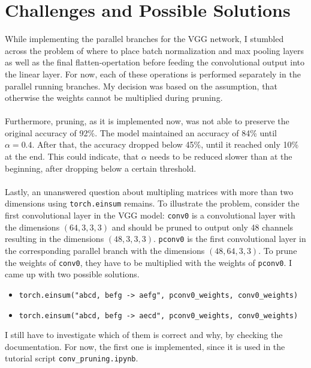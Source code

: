 \documentclass[10pt,twocolumn,letterpaper]{article}
\begin{document}
\section{Challenges and Possible Solutions}
While implementing the parallel branches for the VGG network, I stumbled across the problem of where to place batch normalization and max pooling layers as well as the final flatten-opertation before feeding the convolutional output into the linear layer.
For now, each of these operations is performed separately in the parallel running branches.
My decision was based on the assumption, that otherwise the weights cannot be multiplied during pruning.\\\\
Furthermore, pruning, as it is implemented now, was not able to preserve the original accuracy of 92\%.
The model maintained an accuracy of 84\% until $\alpha=0.4$.
After that, the accuracy dropped below 45\%, until it reached only 10\% at the end.
This could indicate, that $\alpha$ needs to be reduced slower than at the beginning, after dropping below a certain threshold.\\\\
Lastly, an unanswered question about multipling matrices with more than two dimensions using \texttt{torch.einsum} remains.
To illustrate the problem, consider the first convolutional layer in the VGG model:
\texttt{conv0} is a convolutional layer with the dimensions $(64, 3, 3, 3)$ and should be pruned to output only 48 channels resulting in the dimensions $(48, 3, 3, 3)$.
\texttt{pconv0} is the first convolutional layer in the corresponding parallel branch with the dimensions $(48, 64, 3, 3)$.
To prune the weights of \texttt{conv0}, they have to be multiplied with the weights of \texttt{pconv0}.
I came up with two possible solutions.
\begin{itemize}
	\item \texttt{torch.einsum("abcd, befg -> aefg", pconv0\_weights, conv0\_weights)}
	\item \texttt{torch.einsum("abcd, befg ->  aecd", pconv0\_weights, conv0\_weights)}
\end{itemize}
I still have to investigate which of them is correct and why, by checking the documentation.
For now, the first one is implemented, since it is used in the tutorial script \texttt{conv\_pruning.ipynb}.
\end{document}
